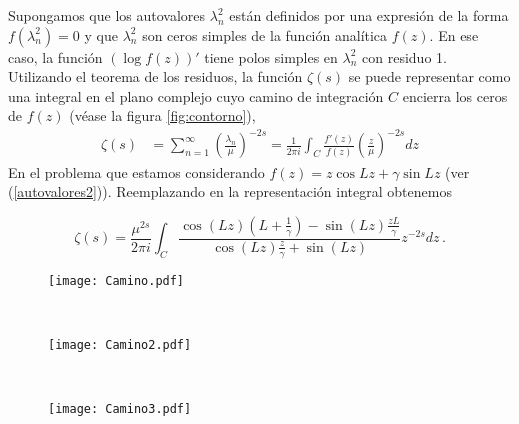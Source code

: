 Supongamos que los autovalores $\lambda ^2 _n$ están definidos por una expresión de
la forma $f ( \lambda ^2 _ n ) = 0$ y que $\lambda ^2 _n$  son ceros simples de la función analítica $f (z)$.
En ese caso, la función $( \log f (z))'$ tiene polos simples en $\lambda ^2 _n$ con residuo 1.
Utilizando el teorema de los residuos, la función $\zeta (s)$ se puede representar
como una integral en el plano complejo cuyo camino de integración $C$
encierra los ceros de $f (z)$ (véase la figura \ref{fig:contorno}),
\begin{equation}
\begin{aligned}
   \zeta  (s) &=  \sum _{n=1} ^{\infty} \left( \frac{\lambda _n}{\mu} \right) ^{-2s} 
   =  
   \frac{1}{2 \pi i} \int _{C} \frac{f'(z)}{f(z)} \left( \frac{z}{\mu} \right) ^{-2s} dz 
\end{aligned}
\label{asd}
\end{equation}
En el problema que estamos considerando $f(z) = z \cos Lz + \gamma \sin Lz$ (ver (\ref{autovalores2})). Reemplazando en la representación integral obtenemos


\begin{equation}
	\zeta  (s) = 
    \frac{\mu ^{2s}}{2 \pi i} \int _{C}
    \frac{ \cos (L z) \left(L + \frac{1}{\gamma} \right) - \sin(L z) \frac{z L}{\gamma}
    }
    { \cos(L z) \frac{z}{\gamma} + \sin(L z)
    }
     z  ^{-2 s} dz  \, .
\end{equation}

\begin{figure*}[t!]
    \centering
    \begin{subfigure}[t]{0.3\textwidth}
        \centering
        \texttt{[image: Camino.pdf]}
        \caption{}
        \label{fig.izquierda}
    \end{subfigure}%
    ~ 
    \begin{subfigure}[t]{0.3\textwidth}
        \centering
        \texttt{[image: Camino2.pdf]}
        \caption{}
        \label{fig.derecha}
    \end{subfigure}
    ~
    \begin{subfigure}[t]{0.3\textwidth}
        \centering
        \texttt{[image: Camino3.pdf]}
        \caption{}
        \label{fig.derecha.derecha}
    \end{subfigure}
    \caption{Estos caminos son los tenidos en cuenta para representar a la {\it función-$\zeta$} como una integral en el plano complejo.}
\label{fig:contorno}
\end{figure*}



